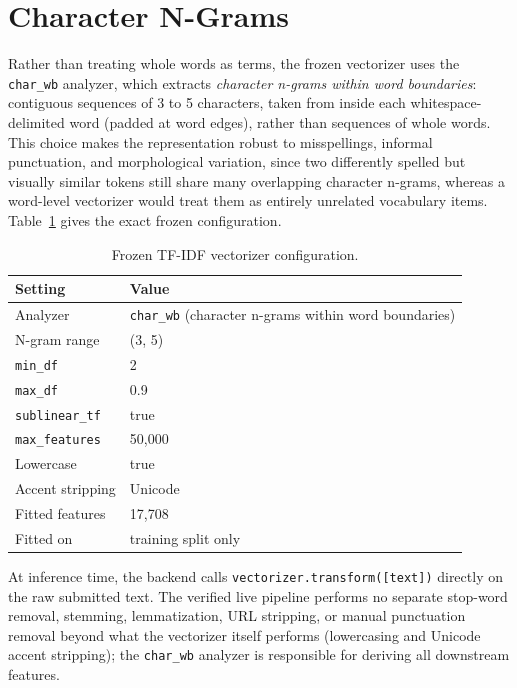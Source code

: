 \section{Character N-Grams}

Rather than treating whole words as terms, the frozen vectorizer uses the \texttt{char\_wb} analyzer, which extracts \emph{character n-grams within word boundaries}: contiguous sequences of 3 to 5 characters, taken from inside each whitespace-delimited word (padded at word edges), rather than sequences of whole words. This choice makes the representation robust to misspellings, informal punctuation, and morphological variation, since two differently spelled but visually similar tokens still share many overlapping character n-grams, whereas a word-level vectorizer would treat them as entirely unrelated vocabulary items. Table~\ref{tab:tfidf-config} gives the exact frozen configuration.

\begin{table}[H]
\centering
\caption{Frozen TF-IDF vectorizer configuration.}
\label{tab:tfidf-config}
\begin{tabular}{ll}
\toprule
\textbf{Setting} & \textbf{Value} \\
\midrule
Analyzer & \texttt{char\_wb} (character n-grams within word boundaries) \\
N-gram range & (3, 5) \\
\texttt{min\_df} & 2 \\
\texttt{max\_df} & 0.9 \\
\texttt{sublinear\_tf} & true \\
\texttt{max\_features} & 50{,}000 \\
Lowercase & true \\
Accent stripping & Unicode \\
Fitted features & 17{,}708 \\
Fitted on & training split only \\
\bottomrule
\end{tabular}
\end{table}

At inference time, the backend calls \texttt{vectorizer.transform([text])} directly on the raw submitted text. The verified live pipeline performs no separate stop-word removal, stemming, lemmatization, URL stripping, or manual punctuation removal beyond what the vectorizer itself performs (lowercasing and Unicode accent stripping); the \texttt{char\_wb} analyzer is responsible for deriving all downstream features.

